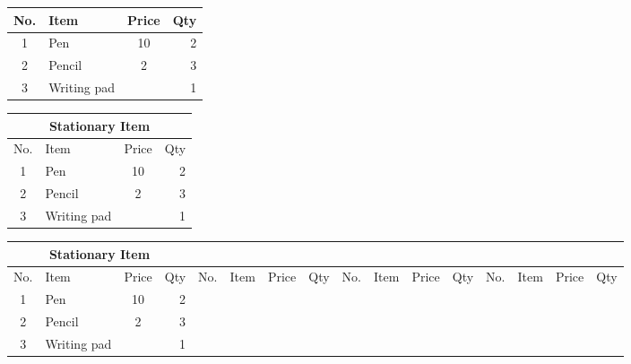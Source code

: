 \documentclass{article}
\begin{document}
	\renewcommand{\arraystretch}{1.5} %
	\begin{tabular}{|c|l|c|r|}
		\hline
		No. & Item & Price & Qty\\
		\hline
		1 & Pen & 10 & 2\\
		\hline
		2 & Pencil & \multirow{2}{*}{2} & 3\\
		\cline{1-2} \cline{4-4}
		3 & Writing pad &  & 1\\
		\hline
	\end{tabular}

	\begin{tabular}{|c|l|c|r|}
		\hline
		\multicolumn{4}{|c|}{Stationary Item} \\
		\hline
		No. & Item & Price & Qty\\
		\hline
		1 & Pen & 10 & 2\\
		\hline
		2 & Pencil & \multirow{2}{*}{2} & 3\\
		\cline{1-2} \cline{4-4}
		3 & Writing pad &  & 1\\
		\hline
	\end{tabular}

	\begin{tabular}{|c|l|c|r|c|l|c|r|c|l|c|r|c|l|c|r|}
		\hline
		\multicolumn{4}{|c|}{Stationary Item} \\
		\hline
		No. & Item & Price & Qty & No. & Item & Price & Qty& No. & Item & Price & Qty & No. & Item & Price & Qty\\
		\hline
		1 & Pen & 10 & 2\\
		\hline
		2 & Pencil & \multirow{2}{*}{2} & 3\\
		\cline{1-2} \cline{4-4}
		3 & Writing pad &  & 1\\
		\hline
	\end{tabular}
\end{document}
